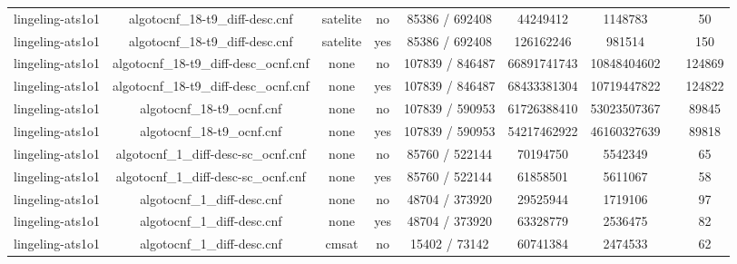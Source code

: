 \begin{appendices}
\begin{table}[p]
\begin{center}
\begin{tabular}{l|cccccccc}
  lingeling-ats1o1               & algotocnf\_18-t9\_diff-desc.cnf & satelite   & no    & 85386 / 692408 & 44249412  & 1148783   &            & 50 \\ %
  lingeling-ats1o1               & algotocnf\_18-t9\_diff-desc.cnf & satelite   & yes   & 85386 / 692408 & 126162246 & 981514    &            & 150 \\ %
  lingeling-ats1o1               & algotocnf\_18-t9\_diff-desc\_ocnf.cnf & none       & no    & 107839 / 846487 & 66891741743 & 10848404602 &            & 124869 \\ %
  lingeling-ats1o1               & algotocnf\_18-t9\_diff-desc\_ocnf.cnf & none       & yes   & 107839 / 846487 & 68433381304 & 10719447822 &            & 124822 \\ %
  lingeling-ats1o1               & algotocnf\_18-t9\_ocnf.cnf     & none       & no    & 107839 / 590953 & 61726388410 & 53023507367 &            & 89845 \\ %
  lingeling-ats1o1               & algotocnf\_18-t9\_ocnf.cnf     & none       & yes   & 107839 / 590953 & 54217462922 & 46160327639 &            & 89818 \\ %
  lingeling-ats1o1               & algotocnf\_1\_diff-desc-sc\_ocnf.cnf & none       & no    & 85760 / 522144 & 70194750  & 5542349   &            & 65 \\ %
  lingeling-ats1o1               & algotocnf\_1\_diff-desc-sc\_ocnf.cnf & none       & yes   & 85760 / 522144 & 61858501  & 5611067   &            & 58 \\ %
  lingeling-ats1o1               & algotocnf\_1\_diff-desc.cnf    & none       & no    & 48704 / 373920 & 29525944  & 1719106   &            & 97 \\ %
  lingeling-ats1o1               & algotocnf\_1\_diff-desc.cnf    & none       & yes   & 48704 / 373920 & 63328779  & 2536475   &            & 82 \\ %
  lingeling-ats1o1               & algotocnf\_1\_diff-desc.cnf    & cmsat      & no    & 15402 / 73142 & 60741384  & 2474533   &            & 62 \\ %

\end{tabular}
\end{center}
\end{table}
\end{appendices}
